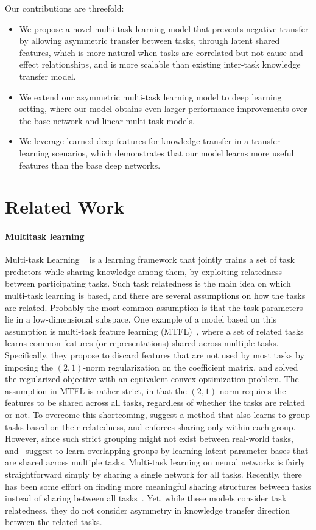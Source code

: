 \documentclass{article}
\begin{document}
	Our contributions are threefold:
	\begin{itemize}
		\item We propose a novel multi-task learning model that prevents negative transfer by allowing asymmetric transfer between tasks, through latent shared features, which is more natural when tasks are correlated but not cause and effect relationships, and is more scalable than existing inter-task knowledge transfer model. 
		\item We extend our asymmetric multi-task learning model to deep learning setting, where our model obtains even larger performance improvements over the base network and linear multi-task models.  
		\item We leverage learned deep features for knowledge transfer in a transfer learning scenarios, which demonstrates that our model learns more useful features than the base deep networks.
	\end{itemize}
	
	\section{Related Work}
	\paragraph{Multitask learning}
	Multi-task Learning ~\cite{caruana97} is a learning framework that jointly trains a set of task predictors while sharing knowledge among them, by exploiting relatedness between participating tasks. Such task relatedness is the main idea on which multi-task learning is based, and there are several assumptions on how the tasks are related. Probably the most common assumption is that the task parameters lie in a low-dimensional subspace. One example of a model based on this assumption is multi-task feature learning (MTFL)~\cite{argyriou08}, where a set of related tasks learns common features (or representations) shared across multiple tasks. Specifically, they propose to discard features that are not used by most tasks by imposing the $(2,1)$-norm regularization on the coefficient matrix, and solved the regularized objective with an equivalent convex optimization problem. The assumption in MTFL is rather strict, in that the $(2,1)$-norm requires the features to be shared across all tasks, regardless of whether the tasks are related or not. To overcome this shortcoming, \cite{kang11} suggest a method that also learns to group tasks based on their relatedness, and enforces sharing only within each group. However, since such strict grouping might not exist between real-world tasks, \cite{go-mtl} and~\cite{maurer2012sparse} suggest to learn overlapping groups by learning latent parameter bases that are shared across multiple tasks. Multi-task learning on neural networks is fairly straightforward simply by sharing a single network for all tasks. Recently, there has been some effort on finding more meaningful sharing structures between tasks instead of sharing between all tasks~\cite{tnrdmtl,dmtrl,sluice}. Yet, while these models consider task relatedness, they do not consider asymmetry in knowledge transfer direction between the related tasks.
	
\end{document}
